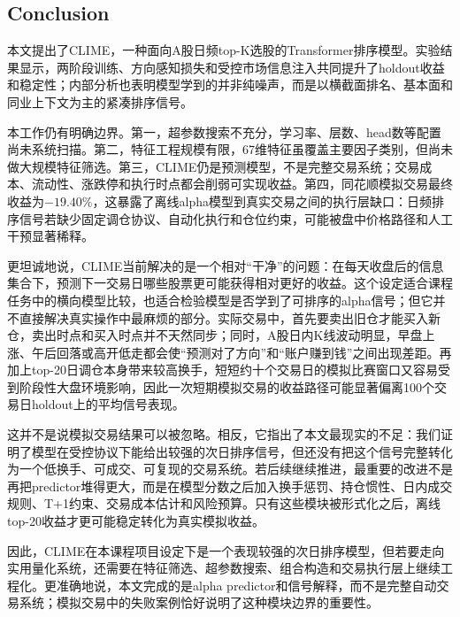 \subsection{Conclusion}

本文提出了CLIME，一种面向A股日频top-K选股的Transformer排序模型。实验结果显示，两阶段训练、方向感知损失和受控市场信息注入共同提升了holdout收益和稳定性；内部分析也表明模型学到的并非纯噪声，而是以横截面排名、基本面和同业上下文为主的紧凑排序信号。

本工作仍有明确边界。第一，超参数搜索不充分，学习率、层数、head数等配置尚未系统扫描。第二，特征工程规模有限，67维特征虽覆盖主要因子类别，但尚未做大规模特征筛选。第三，CLIME仍是预测模型，不是完整交易系统；交易成本、流动性、涨跌停和执行时点都会削弱可实现收益。第四，同花顺模拟交易最终收益为$-19.40\%$，这暴露了离线alpha模型到真实交易之间的执行层缺口：日频排序信号若缺少固定调仓协议、自动化执行和仓位约束，可能被盘中价格路径和人工干预显著稀释。

更坦诚地说，CLIME当前解决的是一个相对“干净”的问题：在每天收盘后的信息集合下，预测下一交易日哪些股票更可能获得相对更好的收益。这个设定适合课程任务中的横向模型比较，也适合检验模型是否学到了可排序的alpha信号；但它并不直接解决真实操作中最麻烦的部分。实际交易中，首先要卖出旧仓才能买入新仓，卖出时点和买入时点并不天然同步；同时，A股日内K线波动明显，早盘上涨、午后回落或高开低走都会使“预测对了方向”和“账户赚到钱”之间出现差距。再加上top-20日调仓本身带来较高换手，短短约十个交易日的模拟比赛窗口又容易受到阶段性大盘环境影响，因此一次短期模拟交易的收益路径可能显著偏离100个交易日holdout上的平均信号表现。

这并不是说模拟交易结果可以被忽略。相反，它指出了本文最现实的不足：我们证明了模型在受控协议下能给出较强的次日排序信号，但还没有把这个信号完整转化为一个低换手、可成交、可复现的交易系统。若后续继续推进，最重要的改进不是再把predictor堆得更大，而是在模型分数之后加入换手惩罚、持仓惯性、日内成交规则、T+1约束、交易成本估计和风险预算。只有这些模块被形式化之后，离线top-20收益才更可能稳定转化为真实模拟收益。

因此，CLIME在本课程项目设定下是一个表现较强的次日排序模型，但若要走向实用量化系统，还需要在特征筛选、超参数搜索、组合构造和交易执行层上继续工程化。更准确地说，本文完成的是alpha predictor和信号解释，而不是完整自动交易系统；模拟交易中的失败案例恰好说明了这种模块边界的重要性。

